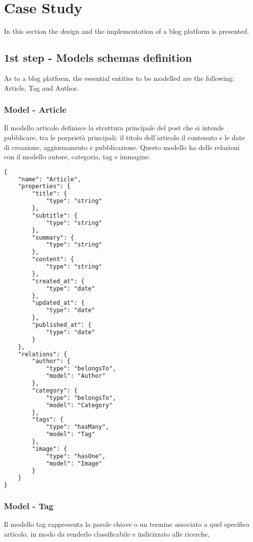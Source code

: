 \section{Case Study}
\label{sec:CAS_castudy}

In this section the design and the implementation of a blog platform is presented.

\subsection{1st step - Models schemas definition}

As to a blog platform, the essential entities to be modelled are the following: Article, Tag and Author.

\subsubsection{Model - Article}

Il modello articolo definisce la struttura principale del post che si intende pubblicare, tra le porprietà principali: il titolo dell'articolo il contenuto e le date di  creazione, aggiornamento e pubblicazione. Questo modello ha delle relazioni con il modello autore, categoria, tag e immagine.

\begin{lstlisting}[language=html]
{
	"name": "Article",
	"properties": {
		"title": {
      		"type": "string"
    	},
    	"subtitle": {
      		"type": "string"
    	},
    	"summary": {
      		"type": "string"
    	},
    	"content": {
      		"type": "string"
    	},
    	"created_at": {
      		"type": "date"
    	},
    	"updated_at": {
      		"type": "date"
    	},
    	"published_at": {
      		"type": "date"
    	}
  	},
	"relations": {
    	"author": {
      		"type": "belongsTo",
      		"model": "Author"
    	},
    	"category": {
      		"type": "belongsTo",
      		"model": "Category"
    	},
    	"tags": {
      		"type": "hasMany",
      		"model": "Tag"
    	},
    	"image": {
      		"type": "hasOne",
      		"model": "Image"
    	}
    }
}
\end{lstlisting}
\subsubsection{Model - Tag}

Il modello tag rappresenta la parole chiave o un termine associato a quel specifico articolo, in modo da renderlo classificabile e indicizzato alle ricerche,


